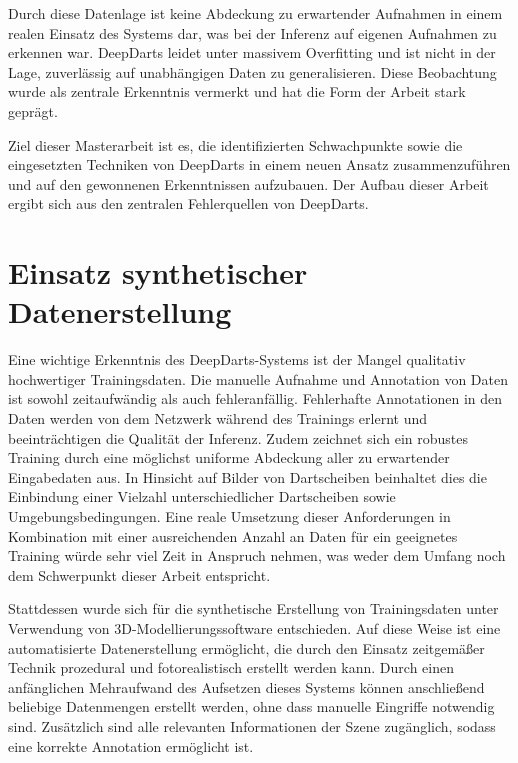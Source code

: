 Durch diese Datenlage ist keine Abdeckung zu erwartender Aufnahmen in einem realen Einsatz des Systems dar, was bei der Inferenz auf eigenen Aufnahmen zu erkennen war. DeepDarts leidet unter massivem Overfitting und ist nicht in der Lage, zuverlässig auf unabhängigen Daten zu generalisieren. Diese Beobachtung wurde als zentrale Erkenntnis vermerkt und hat die Form der Arbeit stark geprägt.

Ziel dieser Masterarbeit ist es, die identifizierten Schwachpunkte sowie die eingesetzten Techniken von DeepDarts in einem neuen Ansatz zusammenzuführen und auf den gewonnenen Erkenntnissen aufzubauen. Der Aufbau dieser Arbeit ergibt sich aus den zentralen Fehlerquellen von DeepDarts.




\section{Einsatz synthetischer Datenerstellung}
\label{sec:einsatz_daten}

Eine wichtige Erkenntnis des DeepDarts-Systems ist der Mangel qualitativ hochwertiger Trainingsdaten. Die manuelle Aufnahme und Annotation von Daten ist sowohl zeitaufwändig als auch fehleranfällig. Fehlerhafte Annotationen in den Daten werden von dem Netzwerk während des Trainings erlernt und beeinträchtigen die Qualität der Inferenz. Zudem zeichnet sich ein robustes Training durch eine möglichst uniforme Abdeckung aller zu erwartender Eingabedaten aus. In Hinsicht auf Bilder von Dartscheiben beinhaltet dies die Einbindung einer Vielzahl unterschiedlicher Dartscheiben sowie Umgebungsbedingungen. Eine reale Umsetzung dieser Anforderungen in Kombination mit einer ausreichenden Anzahl an Daten für ein geeignetes Training würde sehr viel Zeit in Anspruch nehmen, was weder dem Umfang noch dem Schwerpunkt dieser Arbeit entspricht.

Stattdessen wurde sich für die synthetische Erstellung von Trainingsdaten unter Verwendung von 3D-Modellierungssoftware entschieden. Auf diese Weise ist eine automatisierte Datenerstellung ermöglicht, die durch den Einsatz zeitgemäßer Technik prozedural und fotorealistisch erstellt werden kann. Durch einen anfänglichen Mehraufwand des Aufsetzen dieses Systems können anschließend beliebige Datenmengen erstellt werden, ohne dass manuelle Eingriffe notwendig sind. Zusätzlich sind alle relevanten Informationen der Szene zugänglich, sodass eine korrekte Annotation ermöglicht ist.

